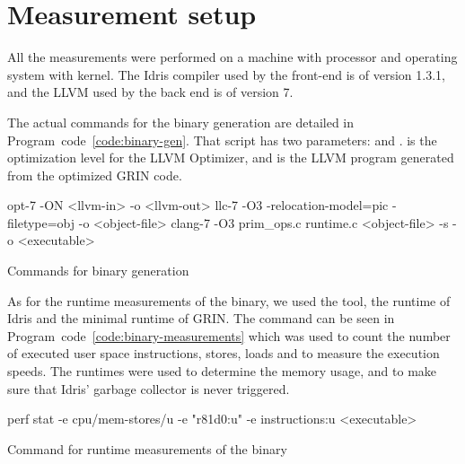 \documentclass[main.tex]{subfiles}
\begin{document}
	\section{Measurement setup}
	
	All the measurements were performed on a machine with  processor and  operating system with  kernel. The Idris compiler used by the front-end is of version 1.3.1, and the LLVM used by the back end is of version 7.
	
	The actual commands for the binary generation are detailed in Program~code~\ref{code:binary-gen}. That script has two parameters:  and .  is the optimization level for the LLVM Optimizer, and  is the LLVM program generated from the optimized GRIN code.
	
	\vspace{-0.5cm}
	\begin{codeFloat}[h]
		\begin{bash}
			opt-7 -ON <llvm-in> -o <llvm-out> 
			llc-7 -O3 -relocation-model=pic -filetype=obj -o <object-file>
			clang-7 -O3 prim_ops.c runtime.c <object-file> -s -o <executable>
		\end{bash}
		\caption{Commands for binary generation}
		\label{code:binary-gen}
	\end{codeFloat}
	\vspace{-0.5cm}
	
	As for the runtime measurements of the binary, we used the  tool, the runtime of Idris and the minimal runtime of GRIN. The  command can be seen in Program~code~\ref{code:binary-measurements} which was used to count the number of executed user space instructions, stores, loads and to measure the execution speeds. The runtimes were used to determine the memory usage, and to make sure that Idris' garbage collector is never triggered.

	\vspace{-0.5cm}
	\begin{codeFloat}[h]
		\begin{bash}
			perf stat -e cpu/mem-stores/u -e "r81d0:u" -e instructions:u <executable>
		\end{bash}
		\caption{Command for runtime measurements of the binary}
		\label{code:binary-measurements}
	\end{codeFloat}
	\vspace{-0.5cm}
	
\end{document}
